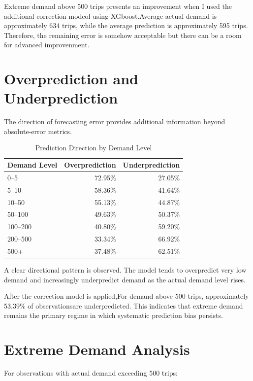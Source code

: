 \documentclass[11pt]{article}
\begin{document}
Extreme demand above 500 trips presents an improvement when I used
the additional correction modeol using XGboost.Average actual demand is 
approximately 634 trips, while the average
prediction is approximately 595 trips. Therefore, the remaining
error is somehow acceptable but there can be a room for advanced
improvenment.


\section{Overprediction and Underprediction}

The direction of forecasting error provides additional information
beyond absolute-error metrics.

\begin{table}[H]
\centering
\caption{Prediction Direction by Demand Level}
\begin{tabular}{lrr}
\toprule
Demand Level &
Overprediction &
Underprediction \\
\midrule
0--5    & 72.95\% & 27.05\% \\
5--10   & 58.36\% & 41.64\% \\
10--50  & 55.13\% & 44.87\% \\
50--100 & 49.63\% & 50.37\% \\
100--200 & 40.80\% & 59.20\% \\
200--500 & 33.34\% & 66.92\% \\
500+     & 37.48\% & 62.51\% \\
\bottomrule
\end{tabular}
\end{table}

A clear directional pattern is observed. The model tends to
overpredict very low demand and increasingly underpredict demand as
the actual demand level rises.

After the correction model is applied,For demand above 500 trips, 
approximately 53.39\% of observationsare underpredicted. This 
indicates that extreme demand remains the
primary regime in which systematic prediction bias persists.


\section{Extreme Demand Analysis}

For observations with actual demand exceeding 500 trips:
\end{document}
